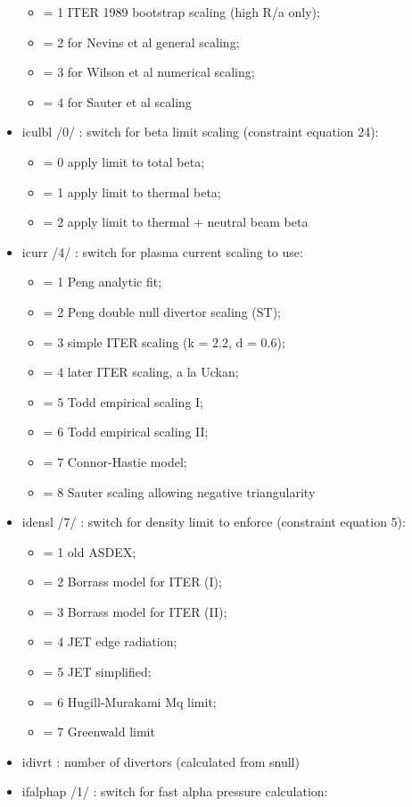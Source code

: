 \documentclass[
]{article}
\providecommand{\tightlist}{%
  \setlength{\itemsep}{0pt}\setlength{\parskip}{0pt}}
\begin{document}
\begin{itemize}
  \begin{itemize}
  \tightlist
  \item
    = 1 ITER 1989 bootstrap scaling (high R/a only);
  \item
    = 2 for Nevins et al general scaling;
  \item
    = 3 for Wilson et al numerical scaling;
  \item
    = 4 for Sauter et al scaling
  \end{itemize}
\item
  iculbl /0/ : switch for beta limit scaling (constraint equation 24):

  \begin{itemize}
  \tightlist
  \item
    = 0 apply limit to total beta;
  \item
    = 1 apply limit to thermal beta;
  \item
    = 2 apply limit to thermal + neutral beam beta
  \end{itemize}
\item
  icurr /4/ : switch for plasma current scaling to use:

  \begin{itemize}
  \tightlist
  \item
    = 1 Peng analytic fit;
  \item
    = 2 Peng double null divertor scaling (ST);
  \item
    = 3 simple ITER scaling (k = 2.2, d = 0.6);
  \item
    = 4 later ITER scaling, a la Uckan;
  \item
    = 5 Todd empirical scaling I;
  \item
    = 6 Todd empirical scaling II;
  \item
    = 7 Connor-Hastie model;
  \item
    = 8 Sauter scaling allowing negative triangularity
  \end{itemize}
\item
  idensl /7/ : switch for density limit to enforce (constraint equation
  5):

  \begin{itemize}
  \tightlist
  \item
    = 1 old ASDEX;
  \item
    = 2 Borrass model for ITER (I);
  \item
    = 3 Borrass model for ITER (II);
  \item
    = 4 JET edge radiation;
  \item
    = 5 JET simplified;
  \item
    = 6 Hugill-Murakami Mq limit;
  \item
    = 7 Greenwald limit
  \end{itemize}
\item
  idivrt : number of divertors (calculated from snull)
\item
  ifalphap /1/ : switch for fast alpha pressure calculation:


\end{itemize}
\end{document}
